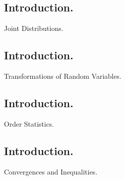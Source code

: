 \documentclass[titlepage]{article}
\begin{document}
\newpage {}

\subsection{Introduction.} Joint Distributions.

\newpage {}

\subsection{Introduction.} Transformations of Random Variables.

\newpage {}

\subsection{Introduction.} Order Statistics.

\newpage {}

\subsection{Introduction.} Convergences and Inequalities.
\end{document}
